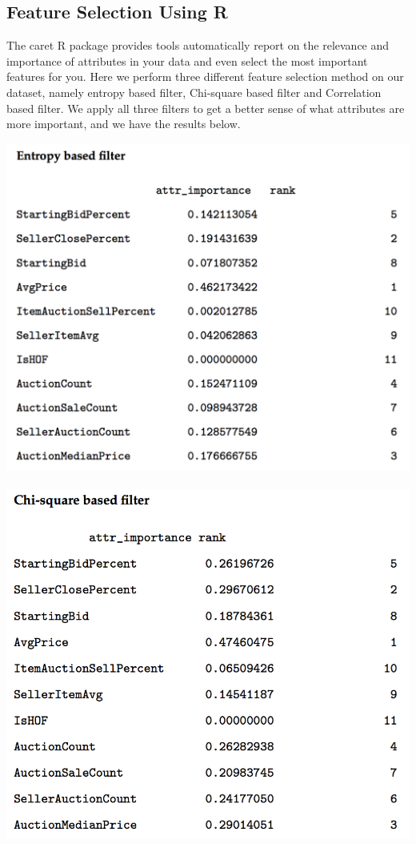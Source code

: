 \documentclass[CEJM,PDF]{cej} %
\begin{document}
\subsection{Feature Selection Using R}
The caret R package provides tools automatically report on the relevance and importance of attributes in your data and even select the most important features for you. Here we perform three different feature selection method on our dataset, namely entropy based filter, Chi-square based filter and Correlation based filter. We apply all three filters to get a better sense of what attributes are more important, and we have the results below.\\
\begin{center}
\includegraphics[scale=0.5]{entropy.png}\\
\mbox{}\\
\includegraphics[scale=0.5]{chi-square.png}\hspace*{2em}

\end{center}
\end{document}
